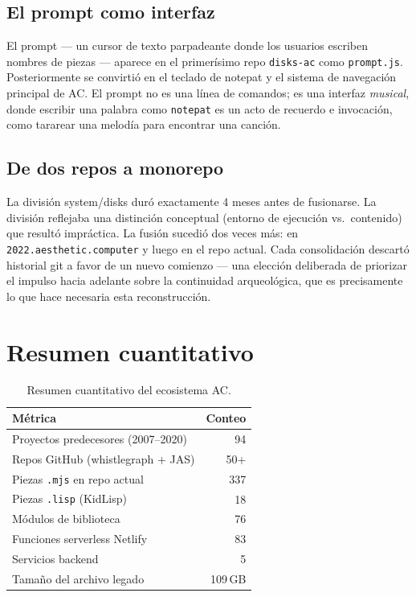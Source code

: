 \documentclass[10pt,letterpaper,twocolumn]{article}
\begin{document}
\subsection{El prompt como interfaz}

El prompt --- un cursor de texto parpadeante donde los usuarios escriben nombres de piezas --- aparece en el primerísimo repo \texttt{disks-ac} como \texttt{prompt.js}. Posteriormente se convirtió en el teclado de notepat y el sistema de navegación principal de AC. El prompt no es una línea de comandos; es una interfaz \emph{musical}, donde escribir una palabra como \texttt{notepat} es un acto de recuerdo e invocación, como tararear una melodía para encontrar una canción.

\subsection{De dos repos a monorepo}

La división system/disks duró exactamente 4 meses antes de fusionarse. La división reflejaba una distinción conceptual (entorno de ejecución vs.\ contenido) que resultó impráctica. La fusión sucedió dos veces más: en \texttt{2022.aesthetic.computer} y luego en el repo actual. Cada consolidación descartó historial git a favor de un nuevo comienzo --- una elección deliberada de priorizar el impulso hacia adelante sobre la continuidad arqueológica, que es precisamente lo que hace necesaria esta reconstrucción.

\section{Resumen cuantitativo}

\begin{table}[h]
\small
\centering
\begin{tabular}{lr}
\toprule
\textbf{Métrica} & \textbf{Conteo} \\
\midrule
Proyectos predecesores (2007--2020) & 94 \\
Repos GitHub (whistlegraph + JAS) & 50+ \\
Piezas \texttt{.mjs} en repo actual & 337 \\
Piezas \texttt{.lisp} (KidLisp) & 18 \\
Módulos de biblioteca & 76 \\
Funciones serverless Netlify & 83 \\
Servicios backend & 5 \\
Tamaño del archivo legado & 109\,GB \\
\bottomrule
\end{tabular}
\caption{Resumen cuantitativo del ecosistema AC.}
\end{table}
\end{document}
